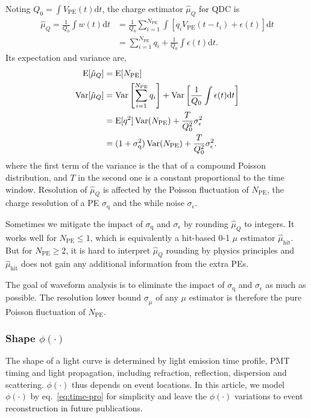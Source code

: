 Noting $Q_0 = {\int V_\mathrm{PE}(t) \mathrm{d} t}$, the charge estimator $\hat{\mu}_Q$ for QDC is
\begin{equation}
  \begin{aligned}
  \label{eq:mu-q}
  \hat{\mu}_Q = \frac{1}{Q_0}\int w(t) \mathrm{d} t &= \frac{1}{Q_0}\sum_{i=1}^{N_\mathrm{PE}} \int \left[ q_i V_\mathrm{PE}(t-t_i) + \epsilon(t) \right] \mathrm{d} t \\
  & = \sum_{i=1}^{N_\mathrm{PE}} q_i + \frac{1}{Q_0} \int \epsilon(t) \mathrm{d} t.
  \end{aligned}
\end{equation}
Its expectation and variance are,
\begin{equation}
  \label{eq:energy}
  \begin{aligned}
    \operatorname{E}[\hat{\mu}_Q] &= \operatorname{E}[N_\mathrm{PE}] \\
    \operatorname{Var}[\hat{\mu}_Q] &= \operatorname{Var}\left[\sum_{i=1}^{N_\mathrm{PE}} q_i\right] + \operatorname{Var}\left[\frac{1}{Q_0} \int \epsilon(t) \mathrm{d} t\right] \\
    &= \operatorname{E}[q^2] \operatorname{Var}(N_\mathrm{PE}) + \frac{T}{Q_0^2} \sigma_\epsilon^2 \\
    &= (1 + \sigma_\mathrm{q}^2) \operatorname{Var}(N_\mathrm{PE}) + \frac{T}{Q_0^2} \sigma_\epsilon^2. \\
  \end{aligned}
\end{equation}
where the first term of the variance is the that of a compound Poisson distribution, and $T$ in the second one is a constant proportional to the time window.  Resolution of $\hat{\mu}_Q$ is affected by the Poisson fluctuation of $N_\mathrm{PE}$, the charge resolution of a PE $\sigma_\mathrm{q}$ and the while noise $\sigma_\epsilon$.

Sometimes we mitigate the impact of $\sigma_\mathrm{q}$ and $\sigma_\epsilon$ by rounding $\hat{\mu}_Q$ to integers.  It works well for $N_\mathrm{PE} \le 1$, which is equivalently a hit-based 0-1 $\mu$ estimator $\hat{\mu}_\mathrm{hit}$.  But for $N_\mathrm{PE} \ge 2$, it is hard to interpret $\hat{\mu}_Q$ rounding by physics principles and $\hat{\mu}_\mathrm{hit}$ does not gain any additional information from the extra PEs.

The goal of waveform analysis is to eliminate the impact of $\sigma_\mathrm{q}$ and $\sigma_\epsilon$ as much as possible.  The resolution lower bound $\underline{\sigma}_\mu$ of any $\mu$ estimator is therefore the pure Poisson fluctuation of $N_\mathrm{PE}$.

\subsubsection{Shape $\phi(\cdot)$}
\label{sec:shape-phicdot}

The shape of a light curve is determined by light emission time profile, PMT timing and light propagation, including refraction, reflection, dispersion and scattering.  $\phi(\cdot)$ thus depends on event locations.  In this article, we model $\phi(\cdot)$ by eq.~\eqref{eq:time-pro} for simplicity and leave the $\phi(\cdot)$ variations to event reconstruction in future publications.
